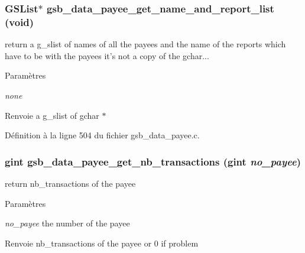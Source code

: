 \subsubsection[{gsb\_\-data\_\-payee\_\-get\_\-name\_\-and\_\-report\_\-list}]{\setlength{\rightskip}{0pt plus 5cm}GSList$\ast$ gsb\_\-data\_\-payee\_\-get\_\-name\_\-and\_\-report\_\-list (void)}\label{gsb__data__payee_8h_a04e398908c76c8314a9dcf22dcadaf49}
return a g\_\-slist of names of all the payees and the name of the reports which have to be with the payees it's not a copy of the gchar...


\begin{DoxyParams}{Paramètres}
\item[{\em none}]\end{DoxyParams}
\begin{DoxyReturn}{Renvoie}
a g\_\-slist of gchar $\ast$ 
\end{DoxyReturn}


Définition à la ligne 504 du fichier gsb\_\-data\_\-payee.c.

\subsubsection[{gsb\_\-data\_\-payee\_\-get\_\-nb\_\-transactions}]{\setlength{\rightskip}{0pt plus 5cm}gint gsb\_\-data\_\-payee\_\-get\_\-nb\_\-transactions (gint {\em no\_\-payee})}\label{gsb__data__payee_8h_a77b531f63870dea239c1f943329aebb1}
return nb\_\-transactions of the payee


\begin{DoxyParams}{Paramètres}
\item[{\em no\_\-payee}]the number of the payee\end{DoxyParams}
\begin{DoxyReturn}{Renvoie}
nb\_\-transactions of the payee or 0 if problem 
\end{DoxyReturn}


